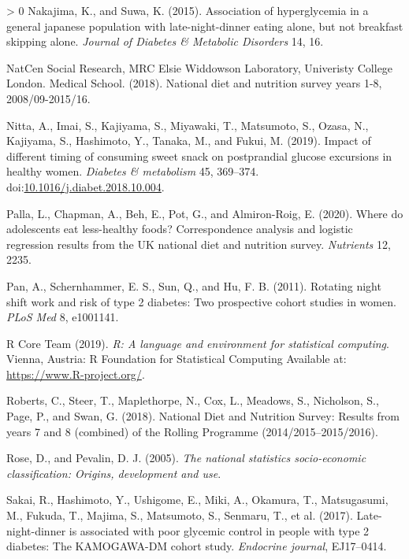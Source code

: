 \documentclass[utf8]{frontiersSCNS}
\newlength{\cslhangindent}
\newenvironment{CSLReferences}[3] %
 {%
  \setlength{\parindent}{0pt}
  \ifodd #1 \everypar{\setlength{\hangindent}{\cslhangindent}}\ignorespaces\fi
  \ifnum #2 > 0
  \setlength{\parskip}{#2\baselineskip}
  \fi
 }%
 {}
\begin{document}
\begin{CSLReferences}{1}{0}
\leavevmode\hypertarget{ref-nakajima2015association}{}%
Nakajima, K., and Suwa, K. (2015). Association of hyperglycemia in a
general japanese population with late-night-dinner eating alone, but not
breakfast skipping alone. \emph{Journal of Diabetes \& Metabolic
Disorders} 14, 16.

\leavevmode\hypertarget{ref-NDNSdatabase2018}{}%
NatCen Social Research, MRC Elsie Widdowson Laboratory, Univeristy
College London. Medical School. (2018). National diet and nutrition
survey years 1-8, 2008/09-2015/16.

\leavevmode\hypertarget{ref-Nitta2019}{}%
Nitta, A., Imai, S., Kajiyama, S., Miyawaki, T., Matsumoto, S., Ozasa,
N., Kajiyama, S., Hashimoto, Y., Tanaka, M., and Fukui, M. (2019).
Impact of different timing of consuming sweet snack on postprandial
glucose excursions in healthy women. \emph{Diabetes \& metabolism} 45,
369--374.
doi:\href{https://doi.org/10.1016/j.diabet.2018.10.004}{10.1016/j.diabet.2018.10.004}.

\leavevmode\hypertarget{ref-palla2020adolescents}{}%
Palla, L., Chapman, A., Beh, E., Pot, G., and Almiron-Roig, E. (2020).
Where do adolescents eat less-healthy foods? Correspondence analysis and
logistic regression results from the UK national diet and nutrition
survey. \emph{Nutrients} 12, 2235.

\leavevmode\hypertarget{ref-pan2011rotating}{}%
Pan, A., Schernhammer, E. S., Sun, Q., and Hu, F. B. (2011). Rotating
night shift work and risk of type 2 diabetes: Two prospective cohort
studies in women. \emph{PLoS Med} 8, e1001141.

\leavevmode\hypertarget{ref-Rcoreteam}{}%
R Core Team (2019). \emph{R: A language and environment for statistical
computing}. Vienna, Austria: R Foundation for Statistical Computing
Available at: \url{https://www.R-project.org/}.

\leavevmode\hypertarget{ref-roberts2018national}{}%
Roberts, C., Steer, T., Maplethorpe, N., Cox, L., Meadows, S.,
Nicholson, S., Page, P., and Swan, G. (2018). National {D}iet and
{N}utrition {S}urvey: Results from years 7 and 8 (combined) of the
{R}olling {P}rogramme (2014/2015--2015/2016).

\leavevmode\hypertarget{ref-rose2005national}{}%
Rose, D., and Pevalin, D. J. (2005). \emph{The national statistics
socio-economic classification: Origins, development and use}.

\leavevmode\hypertarget{ref-sakai2017late}{}%
Sakai, R., Hashimoto, Y., Ushigome, E., Miki, A., Okamura, T.,
Matsugasumi, M., Fukuda, T., Majima, S., Matsumoto, S., Senmaru, T., et
al. (2017). Late-night-dinner is associated with poor glycemic control
in people with type 2 diabetes: The KAMOGAWA-DM cohort study.
\emph{Endocrine journal}, EJ17--0414.


\end{CSLReferences}
\end{document}
